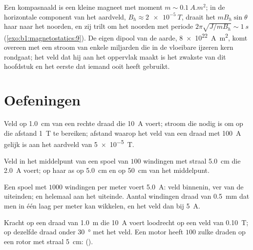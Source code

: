 \begin{example}\label{ex:b1:magnetostatics:compass}
Een kompasnaald is een kleine magneet met moment $m \sim \qty{0.1}{A.m^2}$; in de
horizontale component van het aardveld, $B_h \approx \qty{2e-5}{T}$, draait het
 $mB_h\sin\theta$ haar naar het noorden, en zij trilt om het noorden met
periode $2\pi\sqrt{J/mB_h} \sim \qty{1}{s}$ (\cref{exo:b1:magnetostatics:9}).
De eigen dipool van de aarde, \qty{8e22}{A.m^2}, komt overeen met een stroom van
enkele miljarden  die in de vloeibare ijzeren kern rondgaat; het veld dat hij
aan het oppervlak maakt is het zwakste van dit hoofdstuk en het eerste dat
iemand ooit heeft gebruikt.
\end{example}

\section{Oefeningen}

\begin{exercise}[$\star$]\label{exo:b1:magnetostatics:1}
Veld op \qty{1.0}{cm} van een rechte draad die \qty{10}{A} voert; stroom die
nodig is om op die afstand \qty{1}{T} te bereiken; afstand waarop het veld van een
draad met \qty{100}{A} gelijk is aan het aardveld van \qty{5e-5}{T}.
\end{exercise}

\begin{exercise}[$\star$]\label{exo:b1:magnetostatics:2}
Veld in het middelpunt van een spoel van $100$ windingen met straal \qty{5.0}{cm}
die \qty{2.0}{A} voert; op haar as op \qty{5.0}{cm} en op \qty{50}{cm}
van het middelpunt.
\end{exercise}

\begin{exercise}[$\star$]\label{exo:b1:magnetostatics:3}
Een spoel met $1000$ windingen per meter voert \qty{5.0}{A}: veld binnenin,
ver van de uiteinden; en helemaal aan het uiteinde. Aantal windingen draad van
\qty{0.5}{mm} dat men in één laag per meter kan wikkelen, en het veld dan bij
\qty{5}{A}.
\end{exercise}

\begin{exercise}[$\star$]\label{exo:b1:magnetostatics:4}
Kracht op een draad van \qty{1.0}{m} die \qty{10}{A} voert loodrecht op een veld van
\qty{0.10}{T}; op dezelfde draad onder \qty{30}{\degree} met het veld.
Een motor heeft $100$ zulke draden op een rotor met straal \qty{5}{cm}: 
().
\end{exercise}

